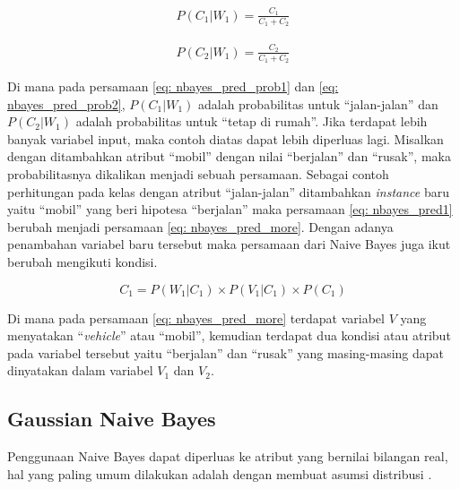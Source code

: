 \begin{enumerate}[label=\textbf{\arabic*).}]
	\begin{equation}\label{eq: nbayes_pred_prob1}
	\begin{split}
	P(C_{1}|W_{1}) = \frac{C_{1}}{C_{1} + C_{2}}
	\end{split}
	\end{equation}
	
	\begin{equation}\label{eq: nbayes_pred_prob2}
	\begin{split}
	P(C_{2}|W_{1}) = \frac{C_{2}}{C_{1} + C_{2}}
	\end{split}
	\end{equation}

	Di mana pada persamaan \ref{eq: nbayes_pred_prob1} dan \ref{eq: nbayes_pred_prob2}, $P(C_{1}|W_{1})$ adalah probabilitas untuk ``jalan-jalan'' dan $P(C_{2}|W_{1})$ adalah probabilitas untuk ``tetap di rumah''. Jika terdapat lebih banyak variabel input, maka contoh diatas dapat lebih diperluas lagi. Misalkan dengan ditambahkan atribut ``mobil'' dengan nilai ``berjalan'' dan ``rusak'', maka probabilitasnya dikalikan menjadi sebuah persamaan. Sebagai contoh perhitungan pada kelas dengan atribut ``jalan-jalan'' ditambahkan \textit{instance} baru yaitu ``mobil'' yang beri hipotesa ``berjalan'' maka persamaan \ref{eq: nbayes_pred1} berubah menjadi persamaan \ref{eq: nbayes_pred_more}. Dengan adanya penambahan variabel baru tersebut maka persamaan dari Naive Bayes juga ikut berubah mengikuti kondisi. 

	\begin{equation}
		\label{eq: nbayes_pred_more}
		C_{1} = P(W_{1}|C_{1}) \times P(V_{1}|C_{1}) \times P(C_{1})
	\end{equation}

	Di mana pada persamaan \ref{eq: nbayes_pred_more} terdapat variabel $V$ yang menyatakan ``\textit{vehicle}'' atau ``mobil'', kemudian terdapat dua kondisi atau atribut pada variabel tersebut yaitu ``berjalan'' dan ``rusak'' yang masing-masing dapat dinyatakan dalam variabel $V_{1}$ dan $V_{2}$.
	\vspace{1ex}
\end{enumerate}

\subsection{Gaussian Naive Bayes}
\label{sec:sub_sec2_gauss_bayes}
\vspace{1ex}

Penggunaan Naive Bayes dapat diperluas ke atribut yang bernilai bilangan real, hal yang paling umum dilakukan adalah dengan membuat asumsi distribusi .
\vspace{1ex}

